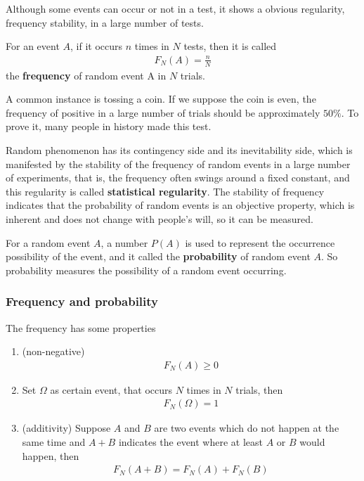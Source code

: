 Although some events can occur or not in a test, it shows a obvious regularity, frequency stability, in a large number of tests.

For an event $A$, if it occurs $n$ times in $N$ tests, then it is called
\begin{align*}
    F_N(A)=\frac{n}{N}
\end{align*}
the \textbf{frequency} of random event A in $N$ trials.

A common instance is tossing a coin. If we suppose the coin is even, the frequency of positive in a large number of trials should be approximately $50\%$. To prove it, many people in history made this test.

Random phenomenon has its contingency side and its inevitability side, which is manifested by the stability of the frequency of random events in a large number of experiments, that is, the frequency often swings around a fixed constant, and this regularity is called \textbf{statistical regularity}. The stability of frequency indicates that the probability of random events is an objective property, which is inherent and does not change with people's will, so it can be measured.

For a random event $A$, a number $P(A)$ is used to represent the occurrence possibility of the event, and it called the \textbf{probability} of random event $A$. So probability measures the possibility of a random event occurring.

\subsubsection{Frequency and probability}
The frequency has some properties
\begin{enumerate}
    \item (non-negative)
    \begin{align}
        F_N(A) \geq 0
    \end{align}
    \item Set $\Omega$ as certain event, that occurs $N$ times in $N$ trials, then
    \begin{align}
        F_N(\Omega) =1
    \end{align}
    \item  (additivity) Suppose $A$ and $B$ are two events which do not happen at the same time and $A+B$ indicates the event where at least $A$ or $B$ would happen, then
    \begin{align}
        F_N(A+B) =F_N(A) +F_N(B)
    \end{align}
\end{enumerate}

